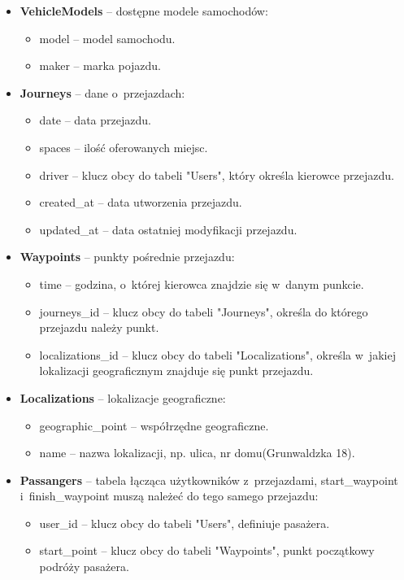 \documentclass[eng,archivemode]{mgr}
\begin{document}
\begin{itemize}
\begin{itemize}
	\end{itemize}
	\item \textbf{VehicleModels} -- dostępne modele samochodów:
	\begin{itemize}
		\item model -- model samochodu.
		\item maker -- marka pojazdu.
	\end{itemize}
	\item \textbf{Journeys} -- dane o~przejazdach:
	\begin{itemize}
		\item date -- data przejazdu.
		\item spaces -- ilość oferowanych miejsc.
		\item driver -- klucz obcy do tabeli "Users", który określa kierowce przejazdu.
		\item created\_at -- data utworzenia przejazdu.
		\item updated\_at -- data ostatniej modyfikacji przejazdu.
	\end{itemize}
	\item \textbf{Waypoints} -- punkty pośrednie przejazdu:
	\begin{itemize}
		\item time -- godzina, o~której kierowca znajdzie się w~danym punkcie.
		\item journeys\_id -- klucz obcy do tabeli "Journeys", określa do którego przejazdu należy punkt.
		\item localizations\_id -- klucz obcy do tabeli "Localizations", określa w~jakiej lokalizacji geograficznym znajduje się punkt przejazdu.
	\end{itemize}
	\item \textbf{Localizations} -- lokalizacje geograficzne:
	\begin{itemize}
		\item geographic\_point -- współrzędne geograficzne.
		\item name -- nazwa lokalizacji, np. ulica, nr domu(Grunwaldzka 18).
	\end{itemize}
	\item \textbf{Passangers} -- tabela łącząca użytkowników z~przejazdami, start\_waypoint i~finish\_waypoint muszą należeć do tego samego przejazdu:
	\begin{itemize}
		\item user\_id --  klucz obcy do tabeli "Users", definiuje pasażera.
		\item start\_point -- klucz obcy do tabeli "Waypoints", punkt początkowy podróży pasażera.

\end{itemize}
\end{itemize}
\end{document}
